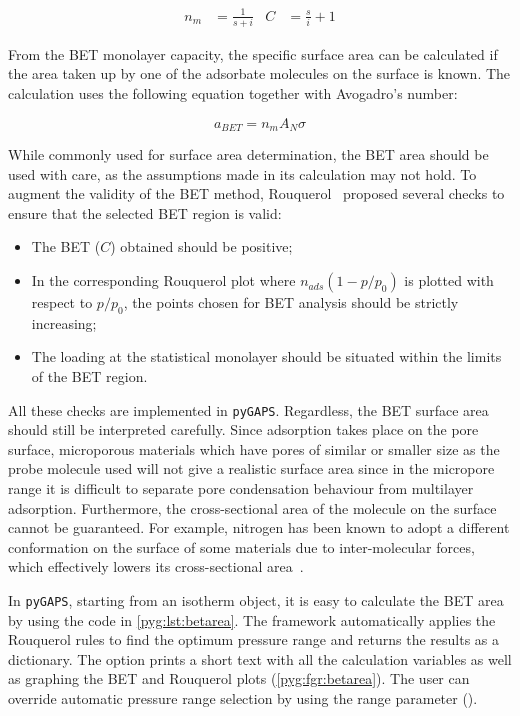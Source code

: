 \begin{align}
	n_{m} & = \frac{1}{s+i} & C & = \frac{s}{i} + 1
\end{align}

From the BET monolayer capacity, the specific surface area can be
calculated if the area taken up by one of the adsorbate molecules
on the surface is known. The calculation uses the following equation
together with Avogadro's number:

\begin{equation}
	a_{BET} = n_m A_N \sigma
\end{equation}

While commonly used for surface area determination, the BET area
should be used with care, as the assumptions made in
its calculation may not hold. To augment the validity of the BET
method, Rouquerol~\cite{rouquerolAdsorptionPowdersPorous2013} proposed
several checks to ensure that the selected BET region is valid:

\begin{itemize}

	\item The BET (\(C\)) obtained should be positive;
	\item In the corresponding Rouquerol plot where \(n_{ads}(1-p/p_0)\)
	      is plotted with respect to \(p/p_0\), the points chosen for BET
	      analysis should be strictly increasing;
	\item The loading at the statistical monolayer should be
	      situated within the limits of the BET region.

\end{itemize}

All these checks are implemented in \texttt{pyGAPS}.
Regardless, the BET surface area should still be interpreted carefully.
Since adsorption takes place on the pore surface, microporous materials
which have pores of similar or smaller size as the probe molecule used
will not give a realistic surface area since in the micropore range
it is difficult to separate pore condensation behaviour from
multilayer adsorption. Furthermore, the cross-sectional
area of the molecule on the surface cannot be guaranteed. For example,
nitrogen has been known to adopt a different conformation on the surface
of some materials due to inter-molecular forces, which effectively
lowers its cross-sectional area~\cite{rouquerolAdsorptionPowdersPorous2013}.

In \texttt{pyGAPS}, starting from an isotherm object, it is easy to
calculate the BET area by using the code in \autoref{pyg:lst:betarea}.
The framework automatically applies the Rouquerol rules to
find the optimum pressure range and returns the results as a
dictionary. The  option prints a short
text with all the calculation variables as well as graphing the
BET and Rouquerol plots (\autoref{pyg:fgr:betarea}).
The user can override
automatic pressure range selection by using the range parameter
().

